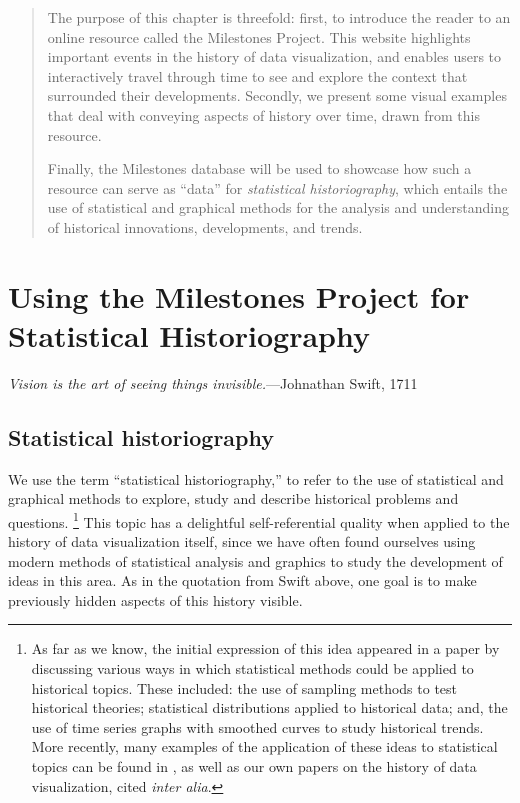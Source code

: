\documentclass[11pt]{article}
\newcommand*{\epigraph}[2]{{\renewcommand{\baselinestretch}{1}\normalfont\emph{#1}\hfill---#2\par\vspace{1ex}}}
\begin{document}
\begin{abstract}
The purpose of this chapter is threefold: first, to introduce the reader to an online resource called the Milestones Project. This website highlights important events in the history of data visualization, and enables users to interactively travel through time to see and explore the context that surrounded their developments. Secondly, we present some visual examples that deal with conveying aspects of history over time, drawn from this resource.

Finally, the Milestones database will be used to showcase how such a resource can serve as ``data'' for \emph{statistical historiography}, which entails the use of statistical and graphical methods for the analysis and understanding of historical innovations, developments, and trends.
\end{abstract}


\section{Using the Milestones Project for Statistical Historiography}\label{sec:historiography}
\epigraph{Vision is the art of seeing things invisible.}{Johnathan Swift, 1711}

\subsection{Statistical historiography}\label{sec:stathist}
We use the term ``statistical historiography,'' to refer to the use of statistical and graphical methods to explore, study and describe historical problems and questions.%
\footnote{As far as we know, the initial expression of this idea appeared in a paper by \citet{Rubin:1943} discussing various ways in which statistical methods could be applied to historical topics.  These included: the use of sampling methods to test historical theories; statistical distributions applied to historical data; and, the use of time series graphs with smoothed curves to study historical trends. More recently, many examples of the application of these ideas to statistical topics can be found in \citet{Stigler:1986,Stigler:1999}, as well as our own papers on the history of data visualization, cited \emph{inter alia}.} 
This topic has a delightful self-referential quality when applied to the history of data visualization itself, since we have often found ourselves using modern methods of statistical analysis and graphics to study the development of ideas in this area. As in the quotation from Swift above, one goal is to make previously hidden aspects of this history visible.
\end{document}
